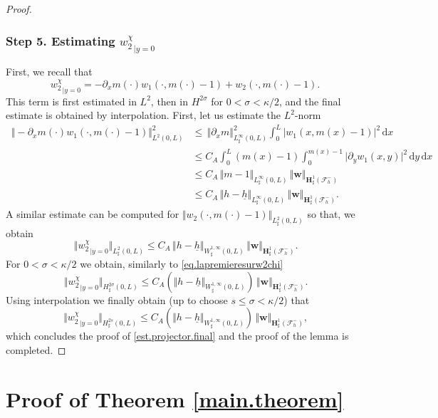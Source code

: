 \documentclass[10pt]{amsart}
\let\mathcal\mathscr
\theoremstyle{remark}
\theoremstyle{definition}
\newcommand{\norme}[1]{\,\Vert #1\Vert}
\newcommand{\vnorme}[1]{\Vert #1\Vert}
\newcommand{\bnorme}[1]{\,\bigl\Vert #1\bigr\Vert}
\newcommand{\dd}{\,\mathrm{d}}
\newcommand{\wg}{\boldsymbol{w}}
\newcommand{\BS}[1]{\boldsymbol{#1}}
\newcommand{\hb}{{\underline{h}}}
\begin{document}
\begin{proof}
\subsubsection*{Step 5. Estimating ${w_{2}^\chi}_{|y=0}$}
First, we recall that
\[
{w_{2}^\chi}_{|{y=0}}=-\partial_x m(\cdot)w_{1}(\cdot,m(\cdot)-1)+w_{2}(\cdot,m(\cdot)-1).
\]
This term is first estimated in $L^2$, then in $H^{2\sigma}$ for $0<\sigma< \kappa/2$, and the final estimate is obtained by interpolation. First, let us estimate the $L^{2}$-norm
\[
\begin{aligned}
\norme{-\partial_x m(\cdot)w_{1}(\cdot,m(\cdot)-1)}_{L^{2}(0,L)}^{2}&{}\leq \norme{\partial_x m}_{L^{\infty}_{\sharp}(0,L)}^{2}\int_{0}^{L}\vert w_{1}(x,m(x)-1)\vert^{2}\dd x\\
&\leq C_{A}\int_{0}^{L}(m(x)-1)\int_{0}^{m(x)-1}\vert\partial_yw_{1}(x,y)\vert^{2}\dd y\dd x\\
&\leq C_{A}\norme{m-1}_{L^{\infty}_{\sharp}(0,L)}\norme{\wg}_{\BS{H}^{1}_{\sharp}(\mathcal{F}^{-}_{h})}\\
&\leq C_{A}\norme{h-\hb}_{L^{\infty}_{\sharp}(0,L)}\norme{\wg}_{\BS{H}^{1}_{\sharp}(\mathcal{F}^{-}_{h})}.
\end{aligned}\]
A similar estimate can be computed for $\vnorme{w_{2}(\cdot,m(\cdot)-1)}_{L^{2}_{\sharp}(0,L)}$ so that, we obtain
\[\bnorme{{w_{2}^\chi}_{|{y=0}}}_{{L}^{2}_{\sharp}(0,L)}\leq C_A\norme{h-\hb}_{W^{1,\infty}_{\sharp}(0,L)}\norme{\wg}_{\BS{H}^{1}_{\sharp}(\mathcal{F}^{-}_{h})}.\]
For $0<\sigma< \kappa/2$ we obtain, similarly to \eqref{eq.lapremieresurw2chi}
\[
\bnorme{{w_{2}^\chi}_{|{y=0}}}_{{H}^{2\sigma}_{\sharp}(0,L)} \leq C_A(\vnorme{h-\hb}_{W^{1,\infty}_{\sharp}(0,L)})\norme{\wg}_{\BS{H}^{1}_{\sharp}(\mathcal{F}^{-}_{h})}.\]
Using interpolation we finally obtain (up to choose $s \leq \sigma < \kappa/2$) that
\[\bnorme{{w_{2}^\chi}_{|{y=0}}}_{H^{2s}_{\sharp}(0,L)}\leq C_A(\vnorme{h-\hb}_{W^{1,\infty}_{\sharp}(0,L)})\norme{\wg}_{\BS{H}^{1}_{\sharp}(\mathcal{F}^{-}_{h})},\]
which concludes the proof of \eqref{est.projector.final} and the proof of the lemma is completed.
\end{proof}

\section{Proof of Theorem \ref{main.theorem}}
\end{document}
